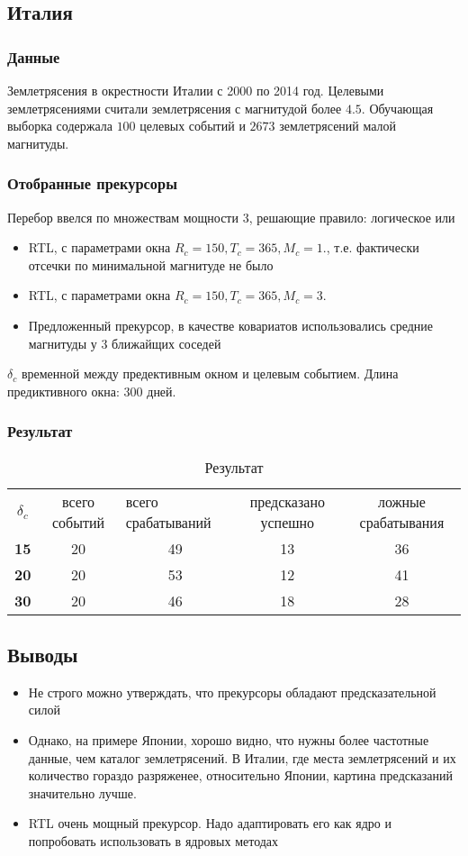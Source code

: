 \subsection{Италия}
\subsubsection*{Данные}
Землетрясения в окрестности Италии с 2000 по 2014 год. Целевыми землетрясениями считали землетрясения с магнитудой более $4.5$. Обучающая выборка содержала $100$ целевых событий и $2673$ землетрясений малой магнитуды.


\subsubsection*{Отобранные прекурсоры}
Перебор ввелся по множествам мощности 3, решающие правило: логическое или
\begin{itemize}
\item RTL, с параметрами окна $R_c = 150, T_c = 365, M_c = 1.$, т.е. фактически отсечки по минимальной магнитуде не было
\item  RTL, с параметрами окна $R_c = 150, T_c = 365, M_c = 3.$
\item Предложенный прекурсор,  в качестве ковариатов использовались средние магнитуды у 3 ближайщих соседей
\end{itemize}


$\delta_c$ временной между предективным окном и целевым событием. Длина предиктивного окна: $300$ дней.

\subsubsection*{Результат}
\begin{table}[H]
\centering
\caption{Результат}
\label{my-label}
\begin{tabular}{ccccc}
$\delta_c$ & всего событий & \multicolumn{1}{l}{всего срабатываний} & предсказано успешно & ложные срабатывания \\
\textbf{15} & 20 & 49  & 13 & 36 \\
\textbf{20} & 20 &  53 &  12 & 41 \\
\textbf{30} & 20 &  46 &  18 & 28
\end{tabular}
\end{table}

\subsection{Выводы}
\begin{itemize}
\item Не строго можно утверждать, что прекурсоры обладают предсказательной силой
\item Однако, на примере  Японии, хорошо видно, что нужны более частотные данные, чем каталог землетрясений. В Италии, где места землетрясений и их количество гораздо разряженее, относительно Японии, картина предсказаний значительно лучше.
\item RTL очень мощный прекурсор. Надо адаптировать его как ядро и попробовать использовать в ядровых методах
\end{itemize}